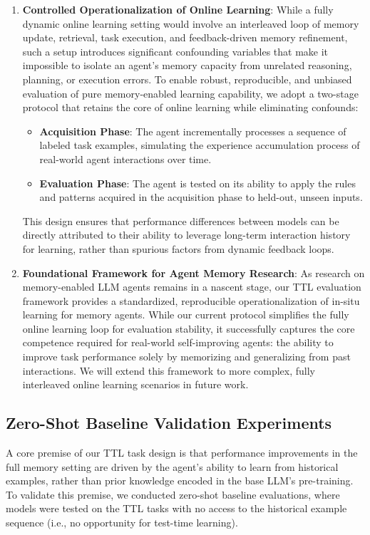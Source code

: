 \begin{enumerate}
    \item \textbf{Controlled Operationalization of Online Learning}: While a fully dynamic online learning setting would involve an interleaved loop of memory update, retrieval, task execution, and feedback-driven memory refinement, such a setup introduces significant confounding variables that make it impossible to isolate an agent's memory capacity from unrelated reasoning, planning, or execution errors. To enable robust, reproducible, and unbiased evaluation of pure memory-enabled learning capability, we adopt a two-stage protocol that retains the core of online learning while eliminating confounds:
    \begin{itemize}
        \item \textbf{Acquisition Phase}: The agent incrementally processes a sequence of labeled task examples, simulating the experience accumulation process of real-world agent interactions over time.
        \item \textbf{Evaluation Phase}: The agent is tested on its ability to apply the rules and patterns acquired in the acquisition phase to held-out, unseen inputs.
    \end{itemize}
    This design ensures that performance differences between models can be directly attributed to their ability to leverage long-term interaction history for learning, rather than spurious factors from dynamic feedback loops.
    \item \textbf{Foundational Framework for Agent Memory Research}: As research on memory-enabled LLM agents remains in a nascent stage, our TTL evaluation framework provides a standardized, reproducible operationalization of in-situ learning for memory agents. While our current protocol simplifies the fully online learning loop for evaluation stability, it successfully captures the core competence required for real-world self-improving agents: the ability to improve task performance solely by memorizing and generalizing from past interactions. We will extend this framework to more complex, fully interleaved online learning scenarios in future work.
\end{enumerate}

\subsection{Zero-Shot Baseline Validation Experiments}
A core premise of our TTL task design is that performance improvements in the full memory setting are driven by the agent's ability to learn from historical examples, rather than prior knowledge encoded in the base LLM's pre-training. To validate this premise, we conducted zero-shot baseline evaluations, where models were tested on the TTL tasks with no access to the historical example sequence (i.e., no opportunity for test-time learning).

